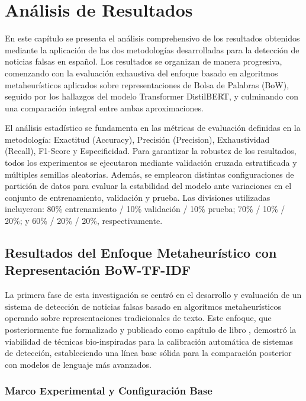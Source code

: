 \chapter{Análisis de Resultados \label{cap:AnalisisDeResultados}}

En este capítulo se presenta el análisis comprehensivo de los resultados obtenidos mediante la aplicación de las dos metodologías desarrolladas para la detección de noticias falsas en español. Los resultados se organizan de manera progresiva, comenzando con la evaluación exhaustiva del enfoque basado en algoritmos metaheurísticos aplicados sobre representaciones de Bolsa de Palabras (BoW), seguido por los hallazgos del modelo Transformer DistilBERT, y culminando con una comparación integral entre ambas aproximaciones.

El análisis estadístico se fundamenta en las métricas de evaluación definidas en la metodología: Exactitud (Accuracy), Precisión (Precision), Exhaustividad (Recall), F1-Score y Especificidad. Para garantizar la robustez de los resultados, todos los experimentos se ejecutaron mediante validación cruzada estratificada y múltiples semillas aleatorias. Además, se emplearon distintas configuraciones de partición de datos para evaluar la estabilidad del modelo ante variaciones en el conjunto de entrenamiento, validación y prueba. Las divisiones utilizadas incluyeron: 80\% entrenamiento / 10\% validación / 10\% prueba; 70\% / 10\% / 20\%; y 60\% / 20\% / 20\%, respectivamente.

\section{Resultados del Enfoque Metaheurístico con Representación BoW-TF-IDF}
\label{sec:resultados_metaheuristicos}

La primera fase de esta investigación se centró en el desarrollo y evaluación de un sistema de detección de noticias falsas basado en algoritmos metaheurísticos operando sobre representaciones tradicionales de texto. Este enfoque, que posteriormente fue formalizado y publicado como capítulo de libro \cite{hurtado2024calibracion}, demostró la viabilidad de técnicas bio-inspiradas para la calibración automática de sistemas de detección, estableciendo una línea base sólida para la comparación posterior con modelos de lenguaje más avanzados.

\subsection{Marco Experimental y Configuración Base}
\label{subsec:marco_experimental_metaheuristicos}


